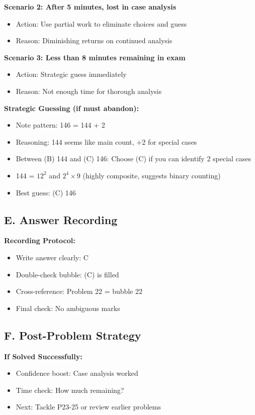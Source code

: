 \documentclass[12pt]{article}
\begin{document}
\begin{competitionbox}
\textbf{Scenario 2: After 5 minutes, lost in case analysis}
\begin{itemize}
    \item Action: Use partial work to eliminate choices and guess
    \item Reason: Diminishing returns on continued analysis
\end{itemize}

\textbf{Scenario 3: Less than 8 minutes remaining in exam}
\begin{itemize}
    \item Action: Strategic guess immediately
    \item Reason: Not enough time for thorough analysis
\end{itemize}

\textbf{Strategic Guessing (if must abandon):}
\begin{itemize}
    \item Note pattern: 146 = 144 + 2
    \item Reasoning: 144 seems like main count, +2 for special cases
    \item Between (B) 144 and (C) 146: Choose (C) if you can identify 2 special cases
    \item 144 = $12^2$ and $2^4 \times 9$ (highly composite, suggests binary counting)
    \item Best guess: (C) 146
\end{itemize}

\subsection*{E. Answer Recording}

\textbf{Recording Protocol:}
\begin{itemize}
    \item Write answer clearly: C
    \item Double-check bubble: (C) is filled
    \item Cross-reference: Problem 22 = bubble 22
    \item Final check: No ambiguous marks
\end{itemize}

\subsection*{F. Post-Problem Strategy}

\textbf{If Solved Successfully:}
\begin{itemize}
    \item Confidence boost: Case analysis worked
    \item Time check: How much remaining?
    \item Next: Tackle P23-25 or review earlier problems
\end{itemize}


\end{competitionbox}
\end{document}
